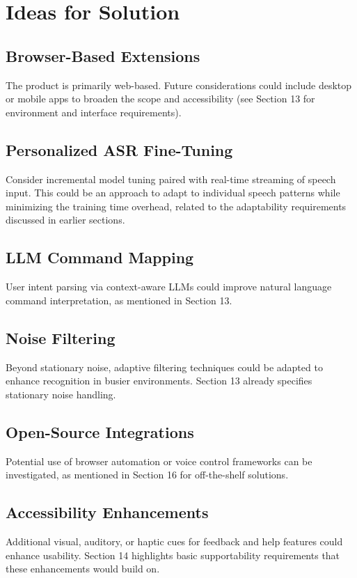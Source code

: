 \documentclass[12pt]{article}
\begin{document}
\section{Ideas for Solution}

\subsection{Browser-Based Extensions}
The product is primarily web-based. Future considerations could include desktop or mobile apps to broaden the scope and accessibility (see Section 13 for environment and interface requirements).

\subsection{Personalized ASR Fine-Tuning}
Consider incremental model tuning paired with real-time streaming of speech input. This could be an approach to adapt to individual speech patterns while minimizing the training time overhead, related to the adaptability requirements discussed in earlier sections.

\subsection{LLM Command Mapping}
User intent parsing via context-aware LLMs could improve natural language command interpretation, as mentioned in Section 13.

\subsection{Noise Filtering}
Beyond stationary noise, adaptive filtering techniques could be adapted to enhance recognition in busier environments. Section 13 already specifies stationary noise handling.

\subsection{Open-Source Integrations}
Potential use of browser automation or voice control frameworks can be investigated, as mentioned in Section 16 for off-the-shelf solutions.

\subsection{Accessibility Enhancements}
Additional visual, auditory, or haptic cues for feedback and help features could enhance usability. Section 14 highlights basic supportability requirements that these enhancements would build on.
\end{document}
